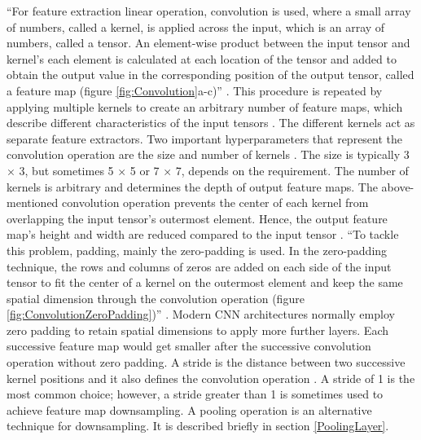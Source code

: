 ``For feature extraction linear operation, convolution is used, where a small array of numbers, called a kernel, is applied across the input, which is an array of numbers, called a tensor. An element-wise product between the input tensor and kernel's each element is calculated at each location of the tensor and added to obtain the output value in the corresponding position of the output tensor, called a feature map (figure \ref{fig:Convolution}a-c)'' \cite{articleCNNs}. This procedure is repeated by applying multiple kernels to create an arbitrary number of feature maps, which describe different characteristics of the input tensors \cite{articleCNNs}. The different kernels act as separate feature extractors. Two important hyperparameters that represent the convolution operation are the size and number of kernels \cite{articleCNNs}. The size is typically 3 × 3, but sometimes 5 × 5 or 7 × 7, depends on the requirement. The number of kernels is arbitrary and determines the depth of output feature maps. The above-mentioned convolution operation prevents the center of each kernel from overlapping the input tensor's outermost element. Hence, the output feature map's height and width are reduced compared to the input tensor \cite{articleCNNs}. ``To tackle this problem, padding, mainly the zero-padding is used. In the zero-padding technique, the rows and columns of zeros are added on each side of the input tensor to fit the center of a kernel on the outermost element and keep the same spatial dimension through the convolution operation (figure \ref{fig:ConvolutionZeroPadding})'' \cite{articleCNNs}. Modern \ac{CNN} architectures normally employ zero padding to retain spatial dimensions to apply more further layers. Each successive feature map would get smaller after the successive convolution operation without zero padding. A stride is the distance between two successive kernel positions and it also defines the convolution operation \cite{articleCNNs}. A stride of 1 is the most common choice; however, a stride greater than 1 is sometimes used to achieve feature map downsampling. A pooling operation is an alternative technique for downsampling. It is described briefly in section \ref{PoolingLayer}.

